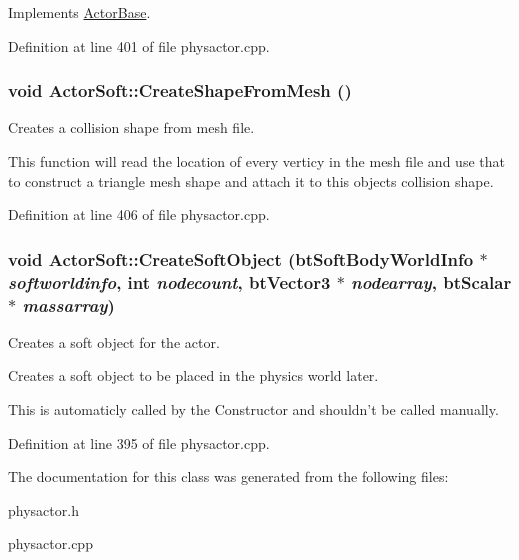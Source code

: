 Implements \hyperlink{classActorBase_a1af82a2ed960fd114518fdf84d5ff146}{ActorBase}.



Definition at line 401 of file physactor.cpp.

\hypertarget{classActorSoft_a55ac461f317aed2b812f07eb384b2a6d}{
\subsubsection[{CreateShapeFromMesh}]{\setlength{\rightskip}{0pt plus 5cm}void ActorSoft::CreateShapeFromMesh ()}}
\label{d5/da4/classActorSoft_a55ac461f317aed2b812f07eb384b2a6d}


Creates a collision shape from mesh file. 

This function will read the location of every verticy in the mesh file and use that to construct a triangle mesh shape and attach it to this objects collision shape. 

Definition at line 406 of file physactor.cpp.

\hypertarget{classActorSoft_a01a570c728d6cb96d1a40003d6b17e22}{
\subsubsection[{CreateSoftObject}]{\setlength{\rightskip}{0pt plus 5cm}void ActorSoft::CreateSoftObject (btSoftBodyWorldInfo $\ast$ {\em softworldinfo}, \/  int {\em nodecount}, \/  btVector3 $\ast$ {\em nodearray}, \/  btScalar $\ast$ {\em massarray})}}
\label{d5/da4/classActorSoft_a01a570c728d6cb96d1a40003d6b17e22}


Creates a soft object for the actor. 

Creates a soft object to be placed in the physics world later. \par
 This is automaticly called by the Constructor and shouldn't be called manually. 

Definition at line 395 of file physactor.cpp.



The documentation for this class was generated from the following files:\begin{DoxyCompactItemize}
\item 
physactor.h\item 
physactor.cpp\end{DoxyCompactItemize}
